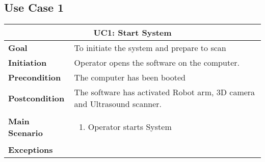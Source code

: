 \subsection{Use Case 1}
\begin{tabular}{ | l | p{} | }
  \hline
  \multicolumn{2}{|c|}{\textbf{UC1: Start System}} \\ \hline
  \textbf{Goal} & To initiate the system and prepare to scan  \\ \hline
  \textbf{Initiation} & Operator opens the software on the computer.  \\ \hline
  \textbf{Precondition} & The computer has been booted  \\ \hline
  \textbf{Postcondition} & The software has activated Robot arm, 3D camera and Ultrasound scanner.  \\ \hline
  \textbf{Main Scenario} & 
  	{\begin{enumerate} 
  	\item Operator starts System
  	\end{enumerate}} \\ \hline
  \textbf{Exceptions} & \hspace{1cm} \\ \hline
\end{tabular}


